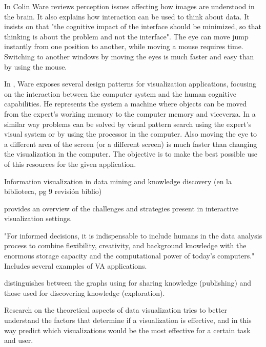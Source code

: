 	
In \autocite{ware_information_2004} Colin Ware reviews perception issues affecting how images are understood in the brain. It also explains how interaction can be used to think about data. It insists on that "the cognitive impact of the interface should be minimized, so that thinking is about the problem and not the interface". The eye can move jump instantly from one position to another, while moving a mouse requires time. Switching to another windows by moving the eyes is much faster and easy than by using the mouse.
	
In \autocite{ware_visual_2013}, Ware exposes several design patterns for visualization applications, focusing on the interaction between the computer system and the human cognitive capabilities. He represents the system a machine where objects can be moved from the expert's working memory to the computer memory and viceverza. In a similar way problems can be solved by visual pattern search using the expert's visual system or by using the processor in the computer. Also moving the eye to a different area of the screen (or a different screen) is much faster than changing the visualization in the computer.
The objective is to make the best possible use of this resources for the given application. 
	
\autocite{fayyad_information_2002}	Information visualization in data mining and knowledge discovery (en la biblioteca, pg 9 revisión biblio)




\autocite{spence_information_2007} provides an overview of the challenges and strategies present in interactive visualization settings.

\autocite{keim_visual_2008} "For informed decisions, it is indispensable to include humans in the data analysis process to combine flexibility, creativity, and background knowledge with the enormous storage capacity and the computational power of today’s computers." Includes several examples of VA applications.
	
\autocite{card_structure_1997}	distinguishes between the graphs using for sharing knowledge (publishing) and those used for discovering knowledge (exploration). 

Research on the theoretical aspects of data visualization \autocite{purchase_theoretical_2008} tries to better understand the factors that determine if a visualization is effective, and in this way predict which visualizations would be the most effective for a certain task and user.
	

